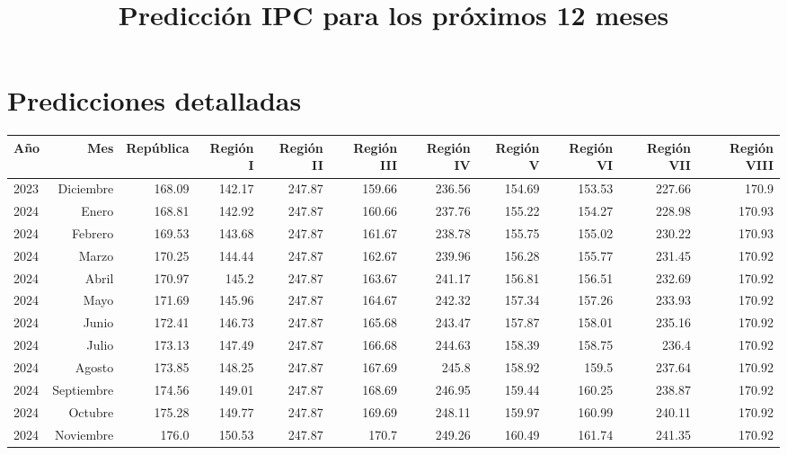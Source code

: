 \documentclass{article}%
\title{Predicción IPC para los próximos 12 meses}%
\date{}%
\begin{document}
%
\normalsize%
\maketitle%
\section*{Predicciones detalladas}%
\label{sec:Prediccionesdetalladas}%
\begin{longtable}{|l r|r|r|r|r|r|r|r|r|r|}%
\hline%
Año&Mes&República&Región I&Región II&Región III&Región IV&Región V&Región VI&Región VII&Región VIII\\%
\hline%
2023&Diciembre&168.09&142.17&247.87&159.66&236.56&154.69&153.53&227.66&170.9\\%
2024&Enero&168.81&142.92&247.87&160.66&237.76&155.22&154.27&228.98&170.93\\%
2024&Febrero&169.53&143.68&247.87&161.67&238.78&155.75&155.02&230.22&170.93\\%
2024&Marzo&170.25&144.44&247.87&162.67&239.96&156.28&155.77&231.45&170.92\\%
2024&Abril&170.97&145.2&247.87&163.67&241.17&156.81&156.51&232.69&170.92\\%
2024&Mayo&171.69&145.96&247.87&164.67&242.32&157.34&157.26&233.93&170.92\\%
2024&Junio&172.41&146.73&247.87&165.68&243.47&157.87&158.01&235.16&170.92\\%
2024&Julio&173.13&147.49&247.87&166.68&244.63&158.39&158.75&236.4&170.92\\%
2024&Agosto&173.85&148.25&247.87&167.69&245.8&158.92&159.5&237.64&170.92\\%
2024&Septiembre&174.56&149.01&247.87&168.69&246.95&159.44&160.25&238.87&170.92\\%
2024&Octubre&175.28&149.77&247.87&169.69&248.11&159.97&160.99&240.11&170.92\\%
2024&Noviembre&176.0&150.53&247.87&170.7&249.26&160.49&161.74&241.35&170.92\\%
\hline%
\end{longtable}

%
\end{document}
